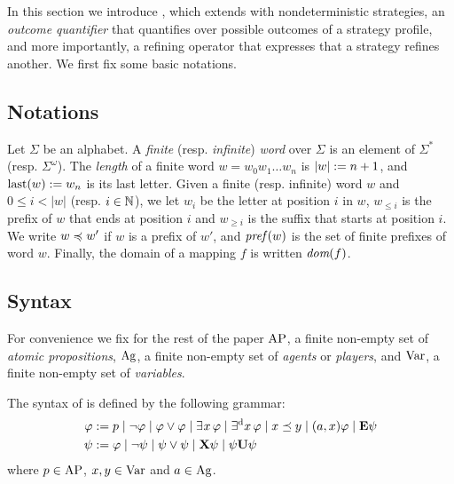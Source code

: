 
In this section we introduce \SLref, which extends \SL 
with nondeterministic strategies,  an \emph{outcome quantifier} that
quantifies over possible outcomes of a strategy profile,
and more importantly, a refining operator that expresses that a
strategy refines another.
We first fix some basic notations.


\subsection{Notations}
Let $\Sigma$ be an alphabet. A \emph{finite} (resp. \emph{infinite}) \emph{word} over $\Sigma$ is an element
of $\Sigma^{*}$ (resp. $\Sigma^{\omega}$). 
The \emph{length} of a finite word $w=w_{0}w_{1}\ldots
w_{n}$ is $|w|:= n+1$, and $\mbox{last}(w):= w_{n}$ is its last
letter.
Given a finite (resp. infinite) word $w$ and $0 \leq i < |w|$  (resp. $i\in\mathbb N$), we let $w_{i}$ be the
letter at position $i$ in $w$, $w_{\leq i}$ is the prefix of $w$ that
ends at position $i$ and $w_{\geq i}$ is the suffix that starts
at position $i$.
We write $w\preccurlyeq w'$ if $w$ is a prefix of $w'$, and $\textit{pref}\,(w)$ is
the set of finite prefixes of word $w$. 
Finally, 
the domain of a mapping $f$ is written $\textit{dom}(f)$.

 \subsection{Syntax}
 \label{sec-SL-definition}

For convenience we fix for the rest of the paper $\textnormal{AP}$, a finite non-empty set of
\emph{atomic propositions}, $\textnormal{Ag}$, a finite non-empty set of \emph{agents} or
\emph{players}, and
$\textnormal{Var}$, a finite non-empty set of \emph{variables}.



\begin{definition}%
  \label{def-SLi}
    The syntax of \SLref is defined by the following grammar:
    \begin{align*}
  \varphi:= &\; p 
  \mid \neg \varphi 
  \mid \varphi\vee\varphi 
               \mid \exists^{} x\,\varphi
               \mid \exists^{\text{d}} x\,\varphi  
               \mid x \preceq y
               \mid (a,x)\varphi
  \mid {\bf E}\psi               
      \\
      \psi:= &\; \varphi
                   \mid \neg \psi
                   \mid \psi\vee \psi
                   \mid {\bf X} \psi
                   \mid  \psi {\bf U} \psi
    \end{align*}
     where 
  $p\in\textnormal{AP}$, $x,y\in\textnormal{Var}$ and $a\in\textnormal{Ag}$.
\end{definition}

